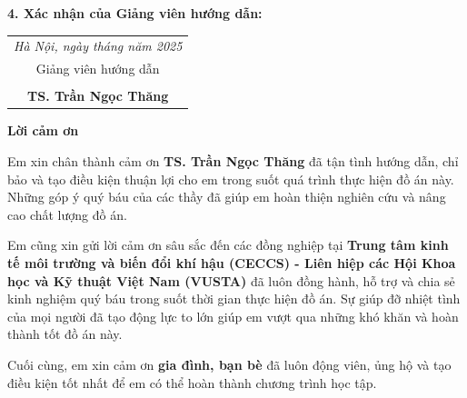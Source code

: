 \vspace{0.2cm}

\noindent \textbf{4. Xác nhận của Giảng viên hướng dẫn:}

\noindent \dotfill

\noindent \dotfill

\vspace{0.5cm}
\begin{flushright}
    \begin{tabular}{c}
        \textit{Hà Nội, ngày \quad tháng \quad năm 2025} \\
        Giảng viên hướng dẫn \\
        \vspace{1.5cm} \\
        \textbf{TS. Trần Ngọc Thăng}
    \end{tabular} \hspace{1cm}
\end{flushright}

\vspace{1cm}
\newpage

\thispagestyle{empty}

\noindent \textbf{\fontsize{20pt}{1.3}\selectfont Lời cảm ơn}

\vspace{0.5cm}

\fontsize{15pt}{1.5}\selectfont

Em xin chân thành cảm ơn \textbf{TS. Trần Ngọc Thăng} đã tận tình hướng dẫn, chỉ bảo và tạo điều kiện thuận lợi cho em trong suốt quá trình thực hiện đồ án này. Những góp ý quý báu của các thầy đã giúp em hoàn thiện nghiên cứu và nâng cao chất lượng đồ án.

\vspace{0.5cm}

Em cũng xin gửi lời cảm ơn sâu sắc đến các đồng nghiệp tại \textbf{Trung tâm kinh tế môi trường và biến đổi khí hậu (CECCS) - Liên hiệp các Hội Khoa học và Kỹ thuật Việt Nam (VUSTA)} đã luôn đồng hành, hỗ trợ và chia sẻ kinh nghiệm quý báu trong suốt thời gian thực hiện đồ án. Sự giúp đỡ nhiệt tình của mọi người đã tạo động lực to lớn giúp em vượt qua những khó khăn và hoàn thành tốt đồ án này.

\vspace{0.5cm}

Cuối cùng, em xin cảm ơn \textbf{gia đình, bạn bè} đã luôn động viên, ủng hộ và tạo điều kiện tốt nhất để em có thể hoàn thành chương trình học tập.

